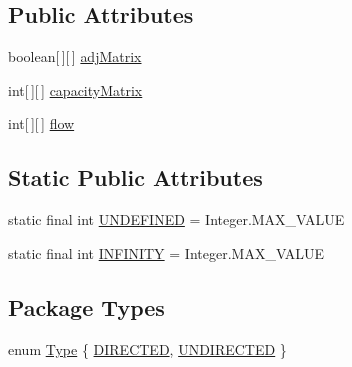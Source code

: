 \subsection*{Public Attributes}
\begin{DoxyCompactItemize}
\item 
boolean\mbox{[}$\,$\mbox{]}\mbox{[}$\,$\mbox{]} \hyperlink{classGraph_a87f661f464d587bc3f6b476c85e800ae}{adjMatrix}
\item 
int\mbox{[}$\,$\mbox{]}\mbox{[}$\,$\mbox{]} \hyperlink{classGraph_a6fe80b61925cedc187fa1ef35c504b1e}{capacityMatrix}
\item 
int\mbox{[}$\,$\mbox{]}\mbox{[}$\,$\mbox{]} \hyperlink{classGraph_ad45717436b6a4ea15d30b88263baeb2a}{flow}
\end{DoxyCompactItemize}
\subsection*{Static Public Attributes}
\begin{DoxyCompactItemize}
\item 
static final int \hyperlink{classGraph_a2dbb2805720a0812f5df6a58d38956af}{UNDEFINED} = Integer.MAX\_\-VALUE
\item 
static final int \hyperlink{classGraph_a282d3ae4575cc3764258ecdb2d8e8fdf}{INFINITY} = Integer.MAX\_\-VALUE
\end{DoxyCompactItemize}
\subsection*{Package Types}
\begin{DoxyCompactItemize}
\item 
enum \hyperlink{classGraph_aa4b8785265efefb668f2931c8f18c8e0}{Type} \{ \hyperlink{classGraph_aa4b8785265efefb668f2931c8f18c8e0}{DIRECTED}, 
\hyperlink{classGraph_aa4b8785265efefb668f2931c8f18c8e0}{UNDIRECTED}
 \}
\end{DoxyCompactItemize}


